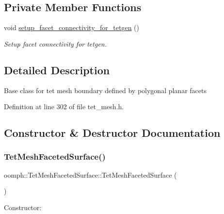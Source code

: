 \subsection*{Private Member Functions}
\begin{DoxyCompactItemize}
\item 
void \hyperlink{classoomph_1_1TetMeshFacetedSurface_aad0696eb07125a0847587b356ebaf735}{setup\+\_\+facet\+\_\+connectivity\+\_\+for\+\_\+tetgen} ()
\begin{DoxyCompactList}\small\item\em Setup facet connectivity for tetgen. \end{DoxyCompactList}\end{DoxyCompactItemize}


\subsection{Detailed Description}
Base class for tet mesh boundary defined by polygonal planar facets 

Definition at line 302 of file tet\+\_\+mesh.\+h.



\subsection{Constructor \& Destructor Documentation}
\mbox{\label{classoomph_1_1TetMeshFacetedSurface_ab11f1e6e44a264849600909929c2067f}} 
\subsubsection{\texorpdfstring{Tet\+Mesh\+Faceted\+Surface()}{TetMeshFacetedSurface()}}
{\footnotesize\ttfamily oomph\+::\+Tet\+Mesh\+Faceted\+Surface\+::\+Tet\+Mesh\+Faceted\+Surface (\begin{DoxyParamCaption}{ }\end{DoxyParamCaption})\hspace{0.3cm}{\ttfamily [inline]}}



Constructor\+: 



